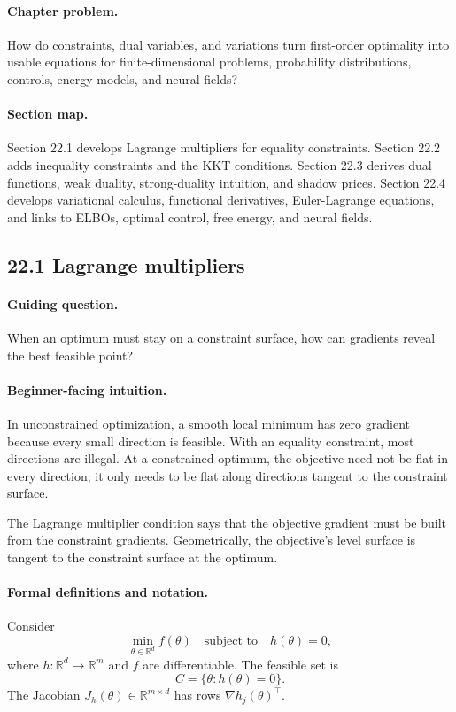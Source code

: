 \paragraph{Chapter problem.}
How do constraints, dual variables, and variations turn first-order optimality into usable equations for finite-dimensional problems, probability distributions, controls, energy models, and neural fields?

\paragraph{Section map.}
Section 22.1 develops Lagrange multipliers for equality constraints. Section 22.2 adds inequality constraints and the KKT conditions. Section 22.3 derives dual functions, weak duality, strong-duality intuition, and shadow prices. Section 22.4 develops variational calculus, functional derivatives, Euler-Lagrange equations, and links to ELBOs, optimal control, free energy, and neural fields.

\subsection{22.1 Lagrange multipliers}

\paragraph{Guiding question.}
When an optimum must stay on a constraint surface, how can gradients reveal the best feasible point?

\paragraph{Beginner-facing intuition.}
In unconstrained optimization, a smooth local minimum has zero gradient because every small direction is feasible. With an equality constraint, most directions are illegal. At a constrained optimum, the objective need not be flat in every direction; it only needs to be flat along directions tangent to the constraint surface.

The Lagrange multiplier condition says that the objective gradient must be built from the constraint gradients. Geometrically, the objective's level surface is tangent to the constraint surface at the optimum.

\paragraph{Formal definitions and notation.}
Consider
\[
\min_{\theta\in\mathbb R^d} f(\theta)
\quad\text{subject to}\quad
h(\theta)=0,
\]
where \(h:\mathbb R^d\to\mathbb R^m\) and \(f\) are differentiable. The feasible set is
\[
C=\{\theta:h(\theta)=0\}.
\]
The Jacobian \(J_h(\theta)\in\mathbb R^{m\times d}\) has rows \(\nabla h_j(\theta)^\top\).

